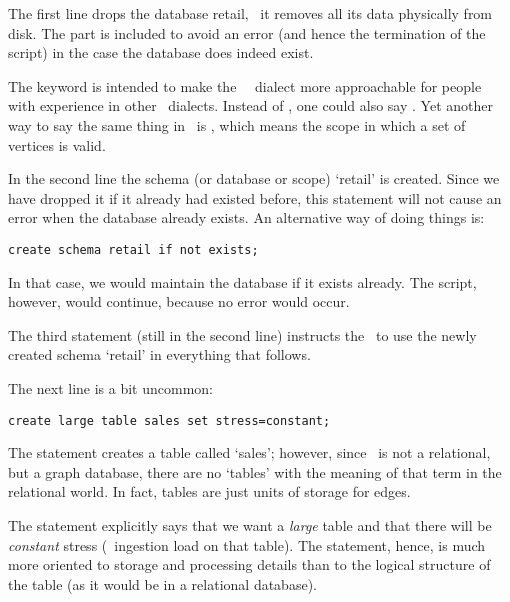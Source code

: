 The first line drops the database retail,
\ie\ it removes all its data physically
from disk. The  part
is included to avoid an error 
(and hence the termination of the script)
in the case
the database does indeed exist.

The keyword  is intended to 
make the \nowdb\ \sql\ dialect more
approachable for people with experience
in other \sql\ dialects. Instead of
, one could also say
. 
Yet another way to say the same thing
in \nowdb\ is , which
means the scope in which a set of
vertices is valid.

In the second line the schema
(or database or scope) `retail'
is created. Since we have dropped it
if it already had existed before,
this statement will not cause
an error when the database already exists.
An alternative way of doing things is:

\begin{sqlcode}
\begin{lstlisting}
create schema retail if not exists;
\end{lstlisting}
\end{sqlcode}

In that case, we would maintain the database
if it exists already. The script, however,
would continue, because no error would occur.

The third statement (still in the second line)
instructs the \nowdb\ to use the newly created
schema `retail' in everything that follows.

The next line is a bit uncommon:

\begin{sqlcode}
\begin{lstlisting}
create large table sales set stress=constant;
\end{lstlisting}
\end{sqlcode}

The statement creates a table called `sales';
however, since \nowdb\ is not a relational,
but a graph database, there are no 
`tables' with the meaning of that term
in the relational world.
In fact, tables are just units of storage 
for edges. 

The statement explicitly says that we
want a \emph{large} table and that there
will be \emph{constant} stress (\ie\ ingestion load
on that table). The  statement,
hence, is much more oriented to storage
and processing details than to the logical structure
of the table (as it would be in a relational database).

